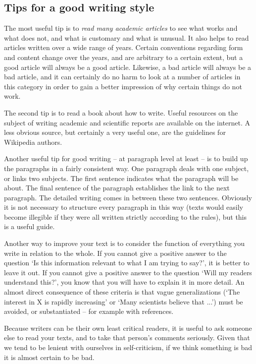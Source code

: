 \subsection{Tips for a good writing style}\label{sec:_tips_for_writing}
The most useful tip is to \textit{read many academic articles} to see what works and what does not, and what is customary and what is unusual. It also helps to read articles written over a wide range of years. Certain conventions regarding form and content change over the years, and are arbitrary to a certain extent, but a good article will always be a good article. Likewise, a bad article will always be a bad article, and it can certainly do no harm to look at a number of articles in this category in order to gain a better impression of why certain things do not work. 

The second tip is to read a book about how to write. Useful resources on the subject of writing academic and scientific reports are available on the internet. A less obvious source, but certainly a very useful one, are the guidelines for Wikipedia authors.

Another useful tip for good writing – at paragraph level at least – is to build up the paragraphs in a fairly consistent way. One paragraph deals with one subject, or links two subjects. The first sentence indicates what the paragraph will be about. The final sentence of the paragraph establishes the link to the next paragraph. The detailed writing comes in between these two sentences. Obviously it is not necessary to structure every paragraph in this way (texts would easily become illegible if they were all written strictly according to the rules), but this is a useful guide.

Another way to improve your text is to consider the function of everything you write in relation to the whole. If you cannot give a positive answer to the question `Is this information relevant to what I am trying to say?', it is better to leave it out. If you cannot give a positive answer to the question `Will my readers understand this?', you know that you will have to explain it in more detail. An almost direct consequence of these criteria is that vague generalizations (`The interest in X is rapidly increasing' or `Many scientists believe that ...') must be avoided, or substantiated – for example with references.

Because writers can be their own least critical readers, it is useful to ask someone else to read your texts, and to take that person's comments seriously. Given that we tend to be lenient with ourselves in self-criticism, if we think something is bad it is almost certain to be bad.